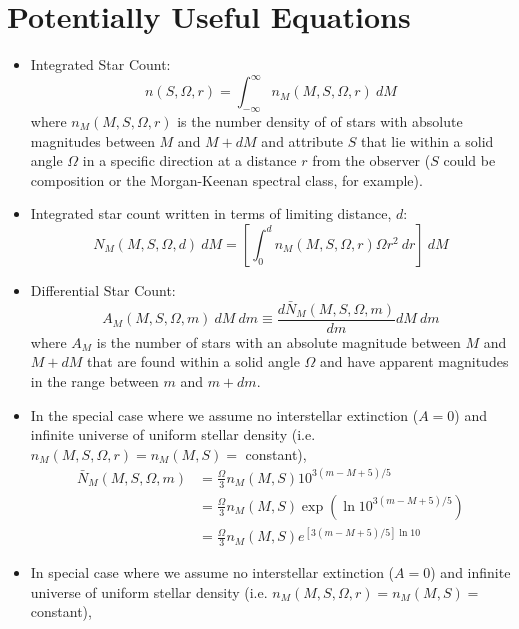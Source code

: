 \documentclass{book}
\begin{document}
\chapter{Potentially Useful Equations}
\begin{itemize}
    \item Integrated Star Count:
          \begin{equation*}
              n(S, \Omega, r) = \int_{- \infty}^\infty n_M (M, S, \Omega, r)\ dM \tag{C\&O 24.2}
          \end{equation*}
          where $n_M (M, S, \Omega, r)$ is the number density of of stars with absolute magnitudes between $M$ and $M+dM$ and attribute $S$ that lie within a solid angle $\Omega$ in a specific direction at a distance $r$ from the observer ($S$ could be composition or the Morgan-Keenan spectral class, for example).
    \item Integrated star count written in terms of limiting distance, $d$:
          \begin{equation*}
              N_M (M, S, \Omega, d)\ dM = \left[ \int_0^d n_M (M, S, \Omega, r) \Omega r^2\ dr \right]\ dM \tag{C\&O 24.3}
          \end{equation*}
    \item Differential Star Count:
          \begin{equation*}
              A_M (M, S, \Omega, m)\ dM\ dm \equiv \frac{d\bar{N}_M (M, S, \Omega, m)}{dm} dM\ dm \tag{C\&O 24.4}
          \end{equation*}
          where $A_M$ is the number of stars with an absolute magnitude between $M$ and $M+dM$ that are found within a solid angle $\Omega$ and have apparent magnitudes in the range between $m$ and $m+dm$.
    \item In the special case where we assume no interstellar extinction ($A=0$) and infinite universe of uniform stellar density (i.e. $n_M(M, S, \Omega, r) = n_M(M, S) = $ constant),
          \begin{align*}
              \bar{N}_M (M, S, \Omega, m) & = \frac{\Omega}{3} n_M (M, S) 10^{3 (m - M + 5)/5}                        \\
                                          & = \frac{\Omega}{3} n_M (M, S) \exp\left( \ln 10^{3 (m - M + 5)/5} \right) \\
                                          & = \frac{\Omega}{3} n_M (M, S) e^{[3 (m - M + 5)/5]\ln 10}
          \end{align*}
    \item In special case where we assume no interstellar extinction ($A=0$) and infinite universe of uniform stellar density (i.e. $n_M(M, S, \Omega, r) = n_M(M, S) = $ constant),

\end{itemize}
\end{document}
